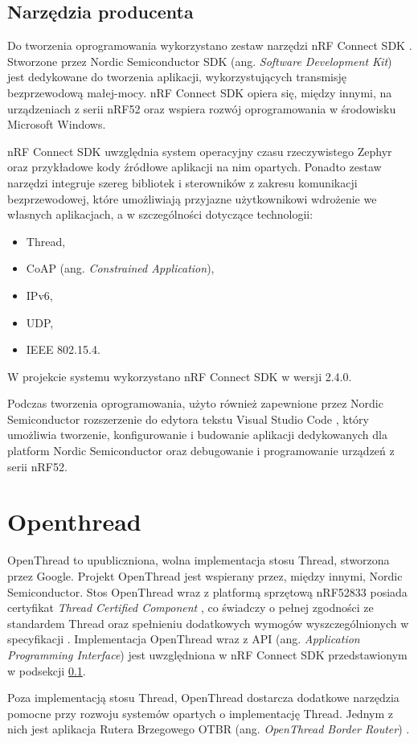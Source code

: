 \subsection{Narzędzia producenta}
\label{subsec:producer-tools}

    Do tworzenia oprogramowania wykorzystano zestaw narzędzi nRF Connect SDK \cite{nrf-connect}. Stworzone przez Nordic Semiconductor SDK (ang. \textit{Software Development Kit}) jest dedykowane do tworzenia aplikacji, wykorzystujących transmisję bezprzewodową małej-mocy. nRF Connect SDK opiera się, między innymi, na urządzeniach z serii nRF52 oraz wspiera rozwój oprogramowania w środowisku Microsoft Windows.

    nRF Connect SDK uwzględnia system operacyjny czasu rzeczywistego Zephyr oraz przykładowe kody źródłowe aplikacji na nim opartych. Ponadto zestaw narzędzi integruje szereg bibliotek i sterowników z zakresu komunikacji bezprzewodowej, które umożliwiają przyjazne użytkownikowi wdrożenie we własnych aplikacjach, a w szczególności dotyczące technologii:
    \begin{itemize}
        \item Thread,
        \item CoAP (ang. \textit{Constrained Application}),
        \item IPv6,
        \item UDP,
        \item IEEE 802.15.4.
    \end{itemize}

    W projekcie systemu wykorzystano nRF Connect SDK w wersji 2.4.0.

    Podczas tworzenia oprogramowania, użyto również zapewnione przez Nordic Semiconductor rozszerzenie do edytora tekstu Visual Studio Code \cite{nrf-ide}, który umożliwia tworzenie, konfigurowanie i budowanie aplikacji dedykowanych dla platform Nordic Semiconductor oraz debugowanie i programowanie urządzeń z serii nRF52. 

\section{Openthread}

    OpenThread to upubliczniona, wolna implementacja stosu Thread, stworzona przez Google. Projekt OpenThread jest wspierany przez, między innymi, Nordic Semiconductor. Stos OpenThread wraz z platformą sprzętową nRF52833 posiada certyfikat \textit{Thread Certified Component} \cite{nrf52833-tcc}, co świadczy o pełnej zgodności ze standardem Thread oraz spełnieniu dodatkowych wymogów wyszczególnionych w specyfikacji \cite{thread-1.3.0}. Implementacja OpenThread wraz z API (ang. \textit{Application Programming Interface}) jest uwzględniona w nRF Connect SDK przedstawionym w podsekcji \ref{subsec:producer-tools}.

    Poza implementacją stosu Thread, OpenThread dostarcza dodatkowe narzędzia pomocne przy rozwoju systemów opartych o implementację Thread. Jednym z nich jest aplikacja Rutera Brzegowego OTBR (ang. \textit{OpenThread Border Router}) \cite{openthread-br}.